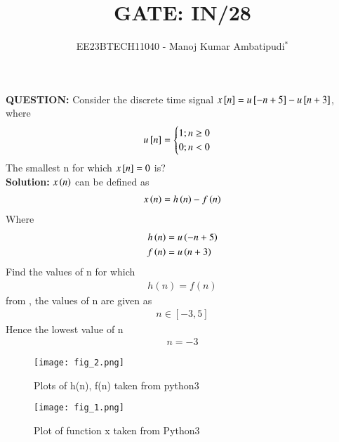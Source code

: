 \documentclass[journal,12pt,twocolumn]{IEEEtran}
\theoremstyle{remark}
\begin{document}

\vspace{3cm}
\title{GATE: IN/28}
\author{EE23BTECH11040 - Manoj Kumar Ambatipudi$^{*}$%
}
\maketitle
\newpage
\bigskip
\renewcommand{\thefigure}{\theenumi}
\renewcommand{\thetable}{\theenumi}
\textbf{QUESTION:}
Consider the discrete time signal $x{}\left[n\right] = u{}\left[-n+5\right] - u{}\left[n+3\right]$, where
\[u{}\left[n\right] = 
\begin{cases}
    1;n\geq0\\
    0;n<0
\end{cases}
\]
The smallest n for which $x{}\left[n\right] = 0$ is?\\
\textbf{Solution:}
$x\left(n\right)$ can be defined as 
\begin{align}
    x\left(n\right) = h\left(n\right) - f\left(n\right)
\end{align}
Where 
\begin{align}
    h\left(n\right) &= u\left(-n+5\right)\\
    f\left(n\right) &= u\left(n+3\right)
\end{align}
Find the values of n for which 
\begin{align}
    h(n) = f(n)
\end{align}
from , the values of n are given as
\begin{align*}
    n \in [-3,5]
\end{align*}
Hence the lowest value of n 
\begin{align}
    \boxed{n = -3}
\end{align}
\begin{figure}[h!]
\renewcommand\thefigure{1}
    \centering
    \texttt{[image: fig\_2.png]}
    \caption{Plots of h(n), f(n) taken from python3}
    \label{IN/28/fig_2}
\end{figure}
\begin{figure}[h!]
\renewcommand\thefigure{2}
    \centering
    \texttt{[image: fig\_1.png]}
    \caption{Plot of function x taken from Python3}
    \label{fig:enter-label}
\end{figure}
\end{document}
